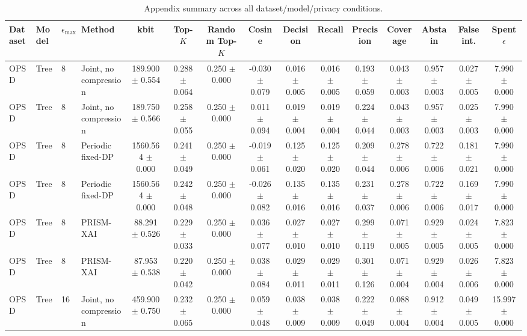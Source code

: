 \begin{table}[t]
\caption{Appendix summary across all dataset/model/privacy conditions.}
\label{tab:appendix-conditions}
\centering
\scriptsize
\setlength{\tabcolsep}{2.5pt}
\begin{tabular}{llllccccccccccc}
\toprule
Dataset & Model & $\epsilon_{\max}$ & Method & kbit & Top-$K$ & Random Top-$K$ & Cosine & Decision & Recall & Precision & Coverage & Abstain & False int. & Spent $\epsilon$ \\
\midrule
OPSD & Tree & 8 & Joint, no compression & 189.900 $\pm$ 0.554 & 0.288 $\pm$ 0.064 & 0.250 $\pm$ 0.000 & -0.030 $\pm$ 0.079 & 0.016 $\pm$ 0.005 & 0.016 $\pm$ 0.005 & 0.193 $\pm$ 0.059 & 0.043 $\pm$ 0.003 & 0.957 $\pm$ 0.003 & 0.027 $\pm$ 0.005 & 7.990 $\pm$ 0.000 \\
OPSD & Tree & 8 & Joint, no compression & 189.750 $\pm$ 0.566 & 0.258 $\pm$ 0.055 & 0.250 $\pm$ 0.000 & 0.011 $\pm$ 0.094 & 0.019 $\pm$ 0.004 & 0.019 $\pm$ 0.004 & 0.224 $\pm$ 0.044 & 0.043 $\pm$ 0.003 & 0.957 $\pm$ 0.003 & 0.025 $\pm$ 0.003 & 7.990 $\pm$ 0.000 \\
OPSD & Tree & 8 & Periodic fixed-DP & 1560.564 $\pm$ 0.000 & 0.241 $\pm$ 0.049 & 0.250 $\pm$ 0.000 & -0.019 $\pm$ 0.061 & 0.125 $\pm$ 0.020 & 0.125 $\pm$ 0.020 & 0.209 $\pm$ 0.044 & 0.278 $\pm$ 0.006 & 0.722 $\pm$ 0.006 & 0.181 $\pm$ 0.021 & 7.990 $\pm$ 0.000 \\
OPSD & Tree & 8 & Periodic fixed-DP & 1560.564 $\pm$ 0.000 & 0.242 $\pm$ 0.048 & 0.250 $\pm$ 0.000 & -0.026 $\pm$ 0.082 & 0.135 $\pm$ 0.016 & 0.135 $\pm$ 0.016 & 0.231 $\pm$ 0.037 & 0.278 $\pm$ 0.006 & 0.722 $\pm$ 0.006 & 0.169 $\pm$ 0.017 & 7.990 $\pm$ 0.000 \\
OPSD & Tree & 8 & PRISM-XAI & 88.291 $\pm$ 0.526 & 0.229 $\pm$ 0.033 & 0.250 $\pm$ 0.000 & 0.036 $\pm$ 0.077 & 0.027 $\pm$ 0.010 & 0.027 $\pm$ 0.010 & 0.299 $\pm$ 0.119 & 0.071 $\pm$ 0.005 & 0.929 $\pm$ 0.005 & 0.024 $\pm$ 0.005 & 7.823 $\pm$ 0.000 \\
OPSD & Tree & 8 & PRISM-XAI & 87.953 $\pm$ 0.538 & 0.220 $\pm$ 0.042 & 0.250 $\pm$ 0.000 & 0.038 $\pm$ 0.084 & 0.029 $\pm$ 0.011 & 0.029 $\pm$ 0.011 & 0.301 $\pm$ 0.126 & 0.071 $\pm$ 0.004 & 0.929 $\pm$ 0.004 & 0.026 $\pm$ 0.006 & 7.823 $\pm$ 0.000 \\
OPSD & Tree & 16 & Joint, no compression & 459.900 $\pm$ 0.750 & 0.232 $\pm$ 0.065 & 0.250 $\pm$ 0.000 & 0.059 $\pm$ 0.048 & 0.038 $\pm$ 0.009 & 0.038 $\pm$ 0.009 & 0.222 $\pm$ 0.049 & 0.088 $\pm$ 0.004 & 0.912 $\pm$ 0.004 & 0.049 $\pm$ 0.005 & 15.997 $\pm$ 0.000 \\

\end{tabular}
\end{table}
